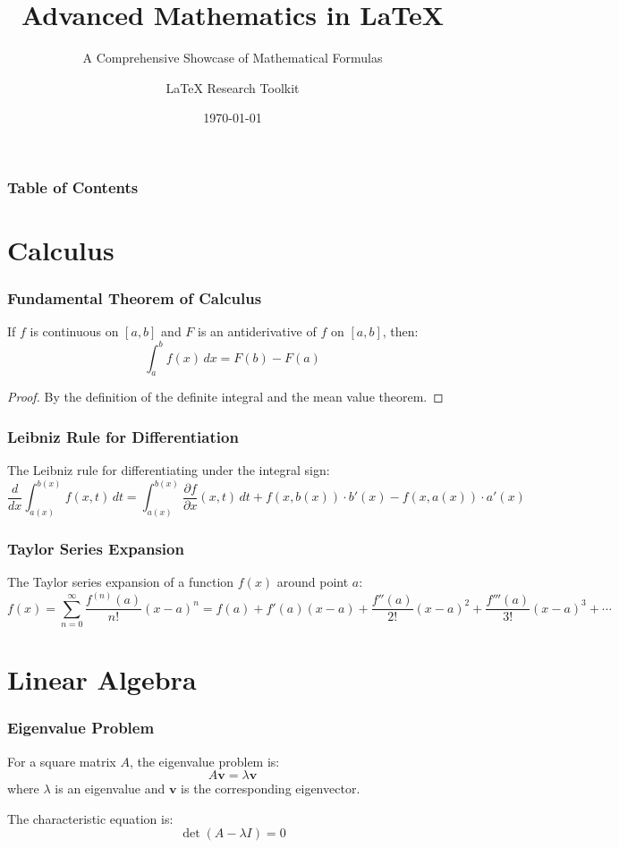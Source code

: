 \documentclass{beamer}
\title{Advanced Mathematics in LaTeX}
\subtitle{A Comprehensive Showcase of Mathematical Formulas}
\author{LaTeX Research Toolkit}
\institute{Mathematics Department}
\date{\today}
\begin{document}
\begin{frame}
\titlepage
\end{frame}

\begin{frame}
\frametitle{Table of Contents}
\tableofcontents
\end{frame}

\section{Calculus}

\begin{frame}
\frametitle{Fundamental Theorem of Calculus}
\begin{theorem}
If $f$ is continuous on $[a,b]$ and $F$ is an antiderivative of $f$ on $[a,b]$, then:
\[
\int_a^b f(x) \, dx = F(b) - F(a)
\]
\end{theorem}

\begin{proof}
By the definition of the definite integral and the mean value theorem.
\end{proof}
\end{frame}

\begin{frame}
\frametitle{Leibniz Rule for Differentiation}
The Leibniz rule for differentiating under the integral sign:
\[
\frac{d}{dx} \int_{a(x)}^{b(x)} f(x,t) \, dt = \int_{a(x)}^{b(x)} \frac{\partial f}{\partial x}(x,t) \, dt + f(x,b(x)) \cdot b'(x) - f(x,a(x)) \cdot a'(x)
\]
\end{frame}

\begin{frame}
\frametitle{Taylor Series Expansion}
The Taylor series expansion of a function $f(x)$ around point $a$:
\[
f(x) = \sum_{n=0}^{\infty} \frac{f^{(n)}(a)}{n!} (x-a)^n = f(a) + f'(a)(x-a) + \frac{f''(a)}{2!}(x-a)^2 + \frac{f'''(a)}{3!}(x-a)^3 + \cdots
\]
\end{frame}

\section{Linear Algebra}

\begin{frame}
\frametitle{Eigenvalue Problem}
For a square matrix $A$, the eigenvalue problem is:
\[
A \mathbf{v} = \lambda \mathbf{v}
\]
where $\lambda$ is an eigenvalue and $\mathbf{v}$ is the corresponding eigenvector.

The characteristic equation is:
\[
\det(A - \lambda I) = 0
\]
\end{frame}
\end{document}
